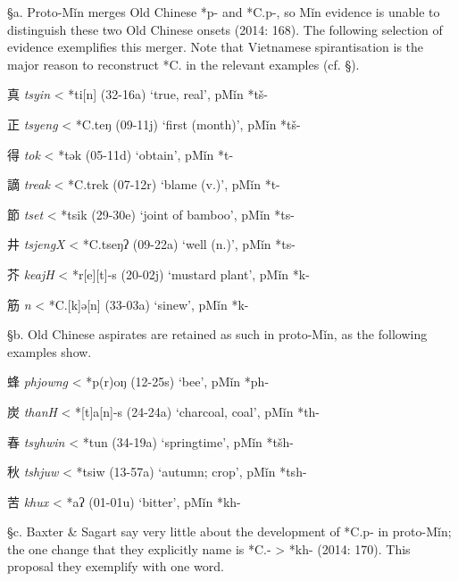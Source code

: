 §a. Proto-Mǐn merges Old Chinese *p- and *C.p-, so Mǐn evidence is
unable to distinguish these two Old Chinese onsets (2014: 168). The
following selection of evidence exemplifies this merger. Note that
Vietnamese spirantisation is the major reason to reconstruct *C. in the
relevant examples (cf. §).

\begin{description} \item
真  \emph{tsyin} \textless{} *ti[n] (32-16a) `true, real', pMǐn *tš-
\item
正  \emph{tsyeng} \textless{} *C.teŋ (09-11j) `first (month)', pMǐn *tš-
\item
得  \emph{tok} \textless{} *t{}ək (05-11d) `obtain', pMǐn *t-
\item
謫  \emph{treak} \textless{} *C.t{}rek (07-12r) `blame (v.)', pMǐn *t-
\item
節  \emph{tset} \textless{} *ts{}ik (29-30e) `joint of bamboo', pMǐn *ts-
\item
井  \emph{tsjengX} \textless{} *C.tseŋʔ (09-22a) `well (n.)', pMǐn *ts-
\item
芥  \emph{keajH} \textless{} *{}r{[}e]{[}t]-s (20-02j) `mustard
plant', pMǐn *k-
\item
筋  \emph{{}n} \textless{} *C.{[}k]ə[n] (33-03a) `sinew', pMǐn *k-
\end{description}

§b. Old Chinese aspirates are retained as such in proto-Mǐn, as the
following examples show.

\begin{description} \item
蜂  \emph{phjowng} \textless{} *p{}(r)oŋ (12-25s) `bee', pMǐn *ph-
\item
炭  \emph{thanH} \textless{} *[t{}]{}a[n]-s (24-24a) `charcoal,
coal', pMǐn *th-
\item
春  \emph{tsyhwin} \textless{} *t{}un (34-19a) `springtime', pMǐn *tšh-
\item
秋  \emph{tshjuw} \textless{} *ts{}iw (13-57a) `autumn; crop', pMǐn *tsh-
\item
苦  \emph{khux} \textless{} *{}{}aʔ (01-01u) `bitter', pMǐn *kh-
\end{description}

§c. Baxter \& Sagart say very little about the development of *C.p{}- in
proto-Mǐn; the one change that they explicitly name is *C.{}-
\textgreater{} *kh- (2014: 170). This proposal they exemplify with one
word.

